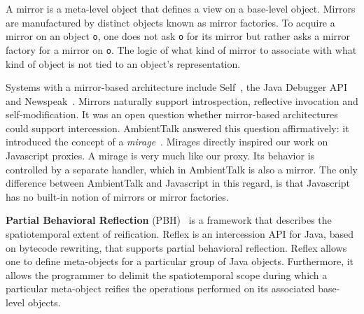 \documentclass{acm_proc_article-sp}
\begin{document}
A mirror is a meta-level object that defines a view on a base-level object. Mirrors are manufactured by distinct objects known as mirror factories. To acquire a mirror on an object \texttt{o}, one does not ask \texttt{o} for its mirror but rather asks a mirror factory for a mirror on \texttt{o}. The logic of what kind of mirror to associate with what kind of object is not tied to an object's representation.

Systems with a mirror-based architecture include Self~\cite{ungar87power}, the Java Debugger API~\cite{jdi} and Newspeak~\cite{bracha10newspeak}. Mirrors naturally support introspection, reflective invocation and self-modification. It was an open question whether mirror-based architectures could support intercession. AmbientTalk answered this question affirmatively: it introduced the concept of a \emph{mirage}~\cite{mostinckx07behavioral,mostinckx09mirrors}. Mirages directly inspired our work on Javascript proxies. A mirage is very much like our proxy. Its behavior is controlled by a separate handler, which in AmbientTalk is also a mirror. The only difference between AmbientTalk and Javascript in this regard, is that Javascript has no built-in notion of mirrors or mirror factories.





\textbf{Partial Behavioral Reflection} (PBH)~\cite{tanter03pbh} is a framework that describes the spatiotemporal extent of reification. Reflex is an intercession API for Java, based on bytecode rewriting, that supports partial behavioral reflection. Reflex allows one to define meta-objects for a particular group of Java objects. Furthermore, it allows the programmer to delimit the spatiotemporal scope during which a particular meta-object reifies the operations performed on its associated base-level objects.
\end{document}
